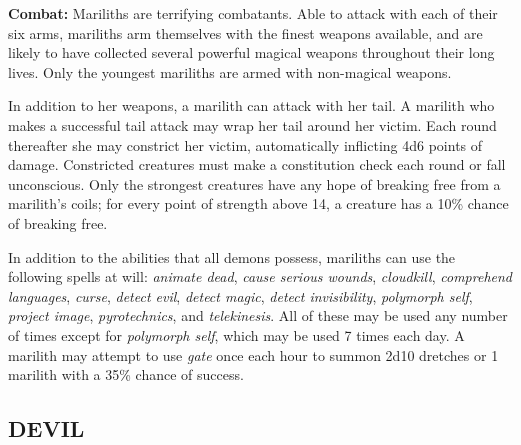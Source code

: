 \begin{multicols}{2}
\textbf{Combat:} Mariliths are terrifying combatants. Able to attack with each of their six arms, mariliths arm themselves with the finest weapons available, and are likely to have collected several powerful magical weapons throughout their long lives. Only the youngest mariliths are armed with non-magical weapons.

In addition to her weapons, a marilith can attack with her tail. A marilith who makes a successful tail attack may wrap her tail around her victim. Each round thereafter she may constrict her victim, automatically inflicting 4d6 points of damage. Constricted creatures must make a constitution check each round or fall unconscious. Only the strongest creatures have any hope of breaking free from a marilith's coils; for every point of strength above 14, a creature has a 10\% chance of breaking free.

In addition to the abilities that all demons possess, mariliths can use the following spells at will: \textit{animate dead}, \textit{cause serious wounds}, \textit{cloudkill}, \textit{comprehend languages}, \textit{curse}, \textit{detect evil}, \textit{detect magic}, \textit{detect invisibility}, \textit{polymorph self}, \textit{project image}, \textit{pyrotechnics}, and \textit{telekinesis}. All of these may be used any number of times except for \textit{polymorph self}, which may be used 7 times each day. A marilith may attempt to use \textit{gate} once each hour to summon 2d10 dretches or 1 marilith with a 35\% chance of success.

\noindent \begin{minipage}{\columnwidth}

\vspace{1em}

\subsection{DEVIL}


\end{minipage}
\end{multicols}
